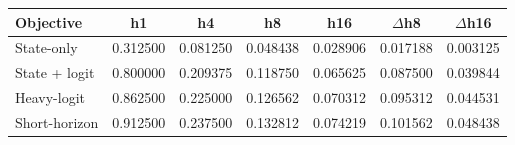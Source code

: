 \begin{tabular}{lcccccc}
\toprule
Objective & h1 & h4 & h8 & h16 & $\Delta$h8 & $\Delta$h16 \\
\midrule
State-only & 0.312500 & 0.081250 & 0.048438 & 0.028906 & 0.017188 & 0.003125 \\
State + logit & 0.800000 & 0.209375 & 0.118750 & 0.065625 & 0.087500 & 0.039844 \\
Heavy-logit & 0.862500 & 0.225000 & 0.126562 & 0.070312 & 0.095312 & 0.044531 \\
Short-horizon & 0.912500 & 0.237500 & 0.132812 & 0.074219 & 0.101562 & 0.048438 \\
\bottomrule
\end{tabular}
